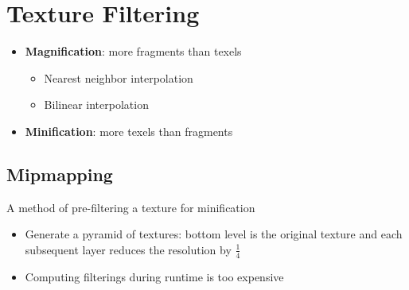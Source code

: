 \section{Texture Filtering}

\begin{itemize}
  \item \textbf{Magnification}: more fragments than texels
  \begin{itemize}
    \item Nearest neighbor interpolation
    \item Bilinear interpolation
  \end{itemize}
  \item \textbf{Minification}: more texels than fragments
\end{itemize}

\subsection{Mipmapping}

  A method of pre-filtering a texture for minification

  \begin{itemize}
    \item Generate a pyramid of textures: bottom level is the original
    texture and each subsequent layer reduces the resolution
    by $ \frac{1}{4} $
    \item Computing filterings during runtime is too expensive
  \end{itemize}
